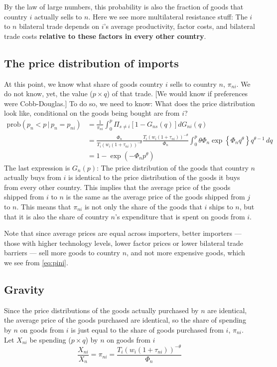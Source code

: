 \documentclass[11pt, pdftex]{article}
\begin{document}
By the law of large numbers, this probability is also the fraction of goods that country $i$ actually sells to $n$.  Here we see more multilateral resistance stuff: The $i$ to $n$ bilateral trade depends on $i$'s average productivity, factor costs, and bilateral trade costs \textbf{relative to these factors in every other country}.

\subsection*{The price distribution of imports}
At this point, we know what share of goods country $i$ sells to country $n$, $\pi_{ni}$.  We do not know, yet, the value ($p\times q$) of that trade. [We would know if preferences were Cobb-Douglas.]  To do so, we need to know: What does the price distribution look like, conditional on the goods being bought are from $i$?
\begin{align}
  \mathrm{prob}\left(p_n < p \, \vert \, p_n=p_{ni}\right) &= \frac{1}{\pi_{ni}}\int_0^p \Pi_{s \neq i}\left[ 1-G_{ns}(q)\right] dG_{ni}(q)\\
  &=\frac{\Phi_n}{T_i \left(w_i\left(1+\tau_{ni} \right) \right)^{-\theta} }\frac{T_i \left(w_i\left(1+\tau_{ni} \right) \right)^{-\theta} }{\Phi_n}\int_0^p \theta \Phi_n \exp\left\{\Phi_n q^\theta \right\} q^{\theta-1}\,dq\\
  & =  1-\exp\left(-\Phi_n p^{\theta}\right)
\end{align}
The last expression is $G_n(p)$: The price distribution of the goods that country $n$ actually buys from $i$ is identical to the price distribution of the goods it buys from every other country. This implies that the average price of the goods shipped from $i$ to $n$ is the same as the average price of the goods shipped from $j$ to $n$.  This means that $\pi_{ni}$ is not only the share of the goods that $i$ ships to $n$, but that it is also the share of country $n$'s expenditure that is spent on goods from $i$.

Note that since average prices are equal across importers, better importers --- those with higher technology levels, lower factor prices or lower bilateral trade barriers --- sell more goods to country $n$, and not more expensive goods, which we see from \eqref{eq:pini}.

\subsection*{Gravity}
Since the price distributions of the goods actually purchased by $n$ are identical, the average price of the goods purchased are identical, so the share of spending by $n$ on goods from $i$ is just equal to the share of goods purchased from $i$, $\pi_{ni}$. Let $X_{ni}$ be spending ($p \times q$) by $n$ on goods from $i$
\begin{equation} \label{eq:shares}
    \frac{X_{ni}}{X_n}=\pi_{ni}= \frac{T_i \left(w_i\left(1+\tau_{ni} \right) \right)^{-\theta} }{\Phi_n}
\end{equation}
\end{document}
